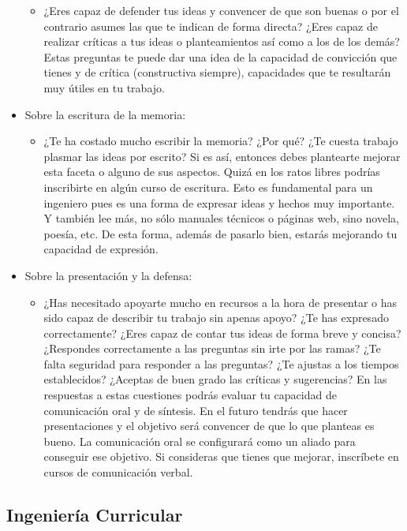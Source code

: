 \begin{itemize}
\begin{itemize}
            \item ¿Eres capaz de defender tus ideas y convencer de que son buenas o por el contrario asumes las que te indican de forma directa? ¿Eres capaz de realizar críticas a tus ideas o planteamientos así como a los de los demás? Estas preguntas te puede dar una idea de la capacidad de convicción que tienes y de crítica (constructiva siempre), capacidades que te resultarán muy útiles en tu trabajo.
        \end{itemize}
    \item Sobre la escritura de la memoria:
        \begin{itemize}
            \item ¿Te ha costado mucho escribir la memoria? ¿Por qué? ¿Te cuesta trabajo plasmar las ideas por escrito? Si es así, entonces debes plantearte mejorar esta faceta o alguno de sus aspectos. Quizá en los ratos libres podrías inscribirte en algún curso de escritura. Esto es fundamental para un ingeniero pues es una forma de expresar ideas y hechos muy importante. Y también lee más, no sólo manuales técnicos o páginas web, sino novela, poesía, etc. De esta forma, además de pasarlo bien, estarás mejorando tu capacidad de expresión.
        \end{itemize}
    \item Sobre la presentación y la defensa:
        \begin{itemize}
            \item ¿Has necesitado apoyarte mucho en recursos a la hora de presentar o has sido capaz de describir tu trabajo sin apenas apoyo? ¿Te has expresado correctamente? ¿Eres capaz de contar tus ideas de forma breve y concisa? ¿Respondes correctamente a las preguntas sin irte por las ramas? ¿Te falta seguridad para responder a las preguntas? ¿Te ajustas a los tiempos establecidos? ¿Aceptas de buen grado las críticas y sugerencias? En las respuestas a estas cuestiones podrás evaluar tu capacidad de comunicación oral y de síntesis. En el futuro tendrás que hacer presentaciones y el objetivo será convencer de que lo que planteas es bueno. La comunicación oral se configurará como un aliado para conseguir ese objetivo. Si consideras que tienes que mejorar, inscríbete en cursos de comunicación verbal.
        \end{itemize}
\end{itemize}

\subsection{Ingeniería Curricular} 

